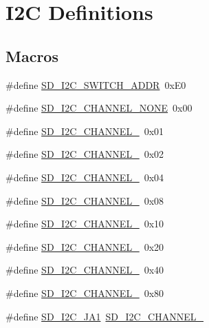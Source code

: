 \hypertarget{group___s_d___i2_c___defines}{}\section{I2C Definitions}
\label{group___s_d___i2_c___defines}
\subsection*{Macros}
\begin{DoxyCompactItemize}
\item 
\#define \mbox{\hyperlink{group___s_d___i2_c___defines_gacb76170cf42752cd56acf4d1221e57da}{S\+D\+\_\+\+I2\+C\+\_\+\+S\+W\+I\+T\+C\+H\+\_\+\+A\+D\+DR}}~0x\+E0
\item 
\#define \mbox{\hyperlink{group___s_d___i2_c___defines_ga93760e77d90ca7e9f3cd885d2ea86a3a}{S\+D\+\_\+\+I2\+C\+\_\+\+C\+H\+A\+N\+N\+E\+L\+\_\+\+N\+O\+NE}}~0x00
\item 
\#define \mbox{\hyperlink{group___s_d___i2_c___defines_ga0c16c172eb6fa64283ba01884a5d0831}{S\+D\+\_\+\+I2\+C\+\_\+\+C\+H\+A\+N\+N\+E\+L\+\_}}~0x01
\item 
\#define \mbox{\hyperlink{group___s_d___i2_c___defines_gaad221fbeeafbe7801d16c980eb7110ca}{S\+D\+\_\+\+I2\+C\+\_\+\+C\+H\+A\+N\+N\+E\+L\+\_}}~0x02
\item 
\#define \mbox{\hyperlink{group___s_d___i2_c___defines_ga663660f8e86f6e4194abe4ec5003d443}{S\+D\+\_\+\+I2\+C\+\_\+\+C\+H\+A\+N\+N\+E\+L\+\_}}~0x04
\item 
\#define \mbox{\hyperlink{group___s_d___i2_c___defines_ga7620821989cd1145949c036be14dbcd6}{S\+D\+\_\+\+I2\+C\+\_\+\+C\+H\+A\+N\+N\+E\+L\+\_}}~0x08
\item 
\#define \mbox{\hyperlink{group___s_d___i2_c___defines_gaa0f1a3a019f024dc10a3a4025cdb2830}{S\+D\+\_\+\+I2\+C\+\_\+\+C\+H\+A\+N\+N\+E\+L\+\_}}~0x10
\item 
\#define \mbox{\hyperlink{group___s_d___i2_c___defines_ga0b586488f6f2252262b412db53e9008f}{S\+D\+\_\+\+I2\+C\+\_\+\+C\+H\+A\+N\+N\+E\+L\+\_}}~0x20
\item 
\#define \mbox{\hyperlink{group___s_d___i2_c___defines_ga6b3724a09c44d903af9f7d1d35fcba84}{S\+D\+\_\+\+I2\+C\+\_\+\+C\+H\+A\+N\+N\+E\+L\+\_}}~0x40
\item 
\#define \mbox{\hyperlink{group___s_d___i2_c___defines_ga26027bd1cdd514db775ea1bd71c0a6e5}{S\+D\+\_\+\+I2\+C\+\_\+\+C\+H\+A\+N\+N\+E\+L\+\_}}~0x80
\item 
\#define \mbox{\hyperlink{group___s_d___i2_c___defines_gadedf88ee6815dea8776214a5a4e40474}{S\+D\+\_\+\+I2\+C\+\_\+\+J\+A1}}~\mbox{\hyperlink{group___s_d___i2_c___defines_ga0c16c172eb6fa64283ba01884a5d0831}{S\+D\+\_\+\+I2\+C\+\_\+\+C\+H\+A\+N\+N\+E\+L\+\_}}

\end{DoxyCompactItemize}
